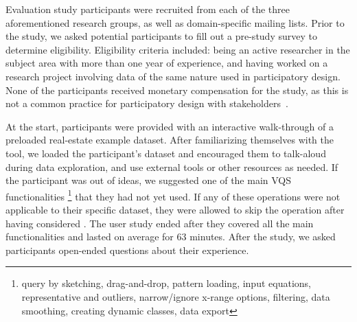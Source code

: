   \par Evaluation study participants were recruited from each of the three aforementioned research groups, as well as domain-specific mailing lists. Prior to the study, we asked potential participants to fill out a pre-study survey to determine eligibility. Eligibility criteria included: being an active researcher in the subject area with more than one year of experience, and having worked on a research project involving data of the same nature used in participatory design. None of the participants received monetary compensation for the study, as this is not a common practice for participatory design with stakeholders~\cite{Ommen2016,McNally2017}. 
  \par At the start, participants were provided with an interactive walk-through of a preloaded real-estate example dataset. After familiarizing themselves with the tool, we loaded the participant's dataset and encouraged them to talk-aloud during data exploration, and use external tools or other resources as needed. If the participant was out of ideas, we suggested one of the main VQS functionalities \footnote{query by sketching, drag-and-drop, pattern loading, input equations, representative and outliers, narrow/ignore x-range options, filtering, data smoothing, creating dynamic classes,  data export} that they had not yet used. If any of these operations were not applicable to their specific dataset, they were allowed to skip the operation after having considered . The user study ended after they covered all the main functionalities and lasted on average for 63 minutes. After the study, we asked participants open-ended questions about their experience.
